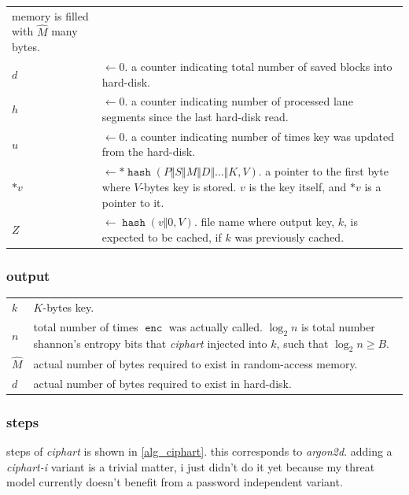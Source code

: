 \documentclass[twocolumn]{article}
\DeclareMathOperator{\enc}{\mathtt{enc}}
\DeclareMathOperator{\hash}{\mathtt{hash}}
\begin{document}
\begin{tabularx}{\columnwidth}{lX}
                    memory is filled with $\hat M$ many bytes.\\
    $d$         & $\gets 0$.  a counter indicating total number of saved
                    blocks into hard-disk.\\
    $h$         & $\gets 0$.  a counter indicating number of processed lane
                    segments since the last hard-disk read.\\
    $u$         & $\gets 0$.  a counter indicating number of times key was
                    updated from the hard-disk.\\
    $*v$         & $\gets *\hash(P \Vert S \Vert M \Vert D \Vert \ldots
                    \Vert K, V)$.  a pointer to the first byte where
                    $V$-bytes key is stored.  $v$ is the key itself, and
                    $*v$ is a pointer to it.\\
    $Z$         & $\gets \hash(v \Vert 0, V)$.  file name where output key,
                    $k$, is expected to be cached, if $k$ was previously
                    cached.\\
\end{tabularx}

\subsubsection{output}
\begin{tabularx}{\columnwidth}{lX}
$k$ & $K$-bytes key.\\
$n$ & total number of times $\enc$ was actually called.  $\log_2 n$ is
        total number shannon's entropy bits that \emph{ciphart} injected
        into $k$, such that $\log_2 n \ge B$.\\
$\hat M$ & actual number of bytes required to exist in random-access
            memory.\\
$d$     & actual number of bytes required to exist in hard-disk.\\
\end{tabularx}

\subsubsection{steps}
steps of \emph{ciphart} is shown in \cref{alg_ciphart}.  this corresponds
to \emph{argon2d}.  adding a \emph{ciphart-i} variant is a trivial matter,
i just didn't do it yet because my threat model currently doesn't benefit
from a password independent variant.
\end{document}
